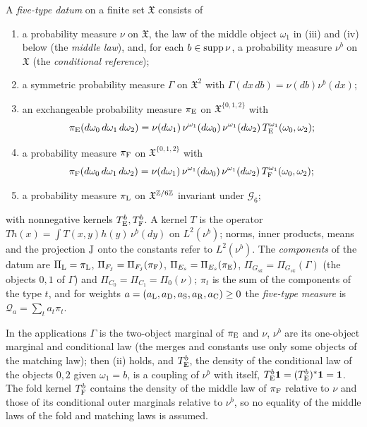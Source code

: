 \begin{definition}\label{def:five-type-datum}
A \emph{five-type datum} on a finite set $\mathfrak X$ consists of
\begin{enumerate}[label=\textup{(\roman*)}]
\item a probability measure $\nu$ on $\mathfrak X$, the law of the middle
 object $\omega_1$ in (iii) and (iv) below (the \emph{middle law}), and,
 for each $b\in\operatorname{supp}\nu$, a probability measure $\nu^b$ on $\mathfrak X$ (the
 \emph{conditional reference});
\item a symmetric probability measure $\Gamma$ on $\mathfrak X^2$ with
 $\Gamma(dx\,db)=\nu(db)\nu^b(dx)$;
\item an exchangeable probability measure $\pi_{\rm E}$ on
 $\mathfrak X^{\{0,1,2\}}$ with
 \[
  \pi_{\rm E}(d\omega_0\,d\omega_1\,d\omega_2)=\nu(d\omega_1)\,\nu^{\omega_1}(d\omega_0)\,
  \nu^{\omega_1}(d\omega_2)\,T_{\rm E}^{\omega_1}(\omega_0,\omega_2);
 \]
\item a probability measure $\pi_{\rm F}$ on $\mathfrak X^{\{0,1,2\}}$ with
 \[
  \pi_{\rm F}(d\omega_0\,d\omega_1\,d\omega_2)=\nu(d\omega_1)\,\nu^{\omega_1}(d\omega_0)\,
  \nu^{\omega_1}(d\omega_2)\,T_{\rm F}^{\omega_1}(\omega_0,\omega_2);
 \]
\item a probability measure $\pi_{\rm L}$ on $\mathfrak X^{\mathbb Z/6\mathbb Z}$ invariant
 under $\mathcal G_6$;
\end{enumerate}
with nonnegative kernels $T_{\rm E}^b,T_{\rm F}^b$. A kernel $T$ is the
operator $Th(x)=\int T(x,y)h(y)\,\nu^b(dy)$ on $L^2(\nu^b)$; norms, inner
products, means and the projection $\mathbb J$ onto the constants refer to
$L^2(\nu^b)$. The \emph{components} of the datum are
$\Pi_{\rm L}=\pi_{\rm L}$, $\Pi_{F_j}=\Pi_{F_j}(\pi_{\rm F})$,
$\Pi_{E_s}=\Pi_{E_s}(\pi_{\rm E})$, $\Pi_{G_{sk}}=\Pi_{G_{sk}}(\Gamma)$ (the
objects $0,1$ of $\Gamma$) and $\Pi_{C_0}=\Pi_{C_1}=\Pi_0(\nu)$; $\pi_t$ is the
sum of the components of the type $t$, and for weights
$a=(a_{\rm L},a_{\rm D},a_{\rm S},a_{\rm R},a_{\rm C})\ge0$ the \emph{five-type
measure} is $\mathcal Q_a=\sum_ta_t\pi_t$.
\end{definition}

In the applications $\Gamma$ is the two-object marginal of $\pi_{\rm E}$ and
$\nu$, $\nu^b$ are its one-object marginal and conditional law (the merges and
constants use only some objects of the matching law); then (ii) holds, and
$T^b_{\rm E}$, the density of the conditional law of the objects $0,2$ given
$\omega_1=b$, is a coupling of $\nu^b$ with itself, $T_{\rm E}^b\mathbf 1=
(T_{\rm E}^b)^*\mathbf 1=\mathbf 1$. The fold kernel $T_{\rm F}^b$ contains the density of
the middle law of $\pi_{\rm F}$ relative to $\nu$ and those of its conditional
outer marginals relative to $\nu^b$, so no equality of the middle laws of the
fold and matching laws is assumed.

